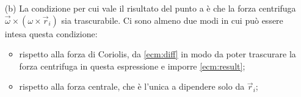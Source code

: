 \documentclass[../main.tex]{subfiles}
\begin{document}
\begin{itemize}
    Se avessi $\vec F_i=\vec F'_i$ potrei ricavare che $\vec a_{ir}$, l'accelerazione relativa al sistema rotante, coincide con quella del sistema fermo senza campo magnetico e questo darebbe la tesi.
    Ma vale che $\vec v_{ir}=\vec v_i-\vec \omega\times \vec r_i$ e perciò la differenza tra le due forze vale
    \begin{equation}
      \label{ecm:diff}
      \vec F_i-\vec F'_i=m (2 \vec \omega \times \dot {\vec {r_i}}- \vec \omega \times (\omega \times \vec r_i))-\frac{e}{c} \cdot \left(\dot {\vec {r_i}} \times \vec B\right)
      =-m\vec \omega \times (\omega \times \vec r_i))-\dot{\vec{r_i}}\times \left(\frac{e}{c} \vec B+2m\vec\omega\right)
    \end{equation}
    Quindi, considerando la parte centrifuga trascurabile (rispetto a cosa non è chiaro, vedi punto b) si ottiene
    \begin{equation}
    \label{ecm:result}
    \vec \omega=-\frac{e}{2mc} \vec B
    \end{equation}
    e cioè il sistema ruota con velocità angolare $-\vec\omega=\frac e{2mc}\vec B$ (ricordiamo infatti che ci eravamo messi a girare \emph{noi} con velocità angolare $\vec\omega$ di modo che il sistema sembrasse comportarsi normalmente).
    \item[(b)]
    La condizione per cui vale il risultato del punto a \`e che la forza centrifuga  $\vec \omega \times (\omega \times \vec r_i)$ sia trascurabile.
    Ci sono almeno due modi in cui pu\`o essere intesa questa condizione:
    
    \begin{itemize}
      \item rispetto alla forza di Coriolis, da \cref{ecm:diff} in modo da poter trascurare la forza centrifuga in questa espressione e imporre \cref{ecm:result};
      \item rispetto alla forza centrale, che \`e l'unica a dipendere solo da $\vec r_i$;
    \end{itemize}
    
    
  \end{itemize}
\end{document}
